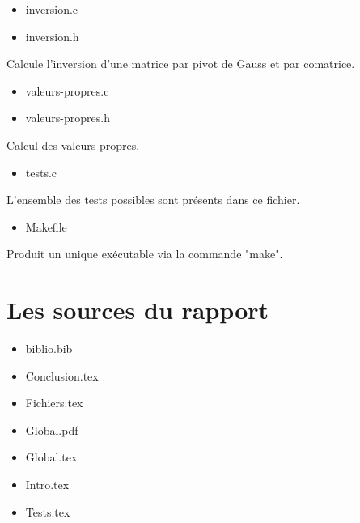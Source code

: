 \begin{itemize}
	\item inversion.c
	\item inversion.h
\end{itemize}
Calcule l'inversion d'une matrice par pivot de Gauss et par comatrice.

\begin{itemize}
	\item valeurs-propres.c
	\item valeurs-propres.h
\end{itemize}
Calcul des valeurs propres.

\begin{itemize}
	\item tests.c
\end{itemize}
L'ensemble des tests possibles sont présents dans ce fichier.

\begin{itemize}
	\item Makefile
\end{itemize}
Produit un unique exécutable via la commande "make".

\section{Les sources du rapport}


\begin{itemize}
	\item biblio.bib
	\item Conclusion.tex
	\item Fichiers.tex
	\item Global.pdf
	\item Global.tex
	\item Intro.tex
	\item Tests.tex
\end{itemize}

\clearpage
